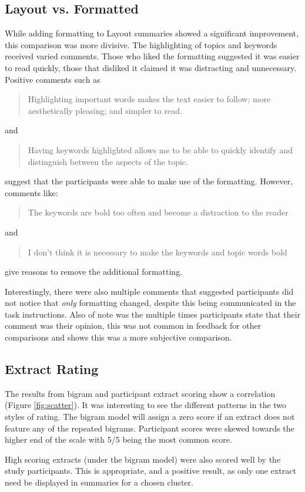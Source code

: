     \tocless\subsection{Layout vs. Formatted}
      While adding formatting to Layout summaries showed a significant improvement, this comparison was more divisive. The highlighting of topics and keywords received varied comments. Those who liked the formatting suggested it was easier to read quickly, those that disliked it claimed it was distracting and unnecessary. Positive comments such as \blockquote{Highlighting important words makes the text easier to follow; more aesthetically pleasing; and simpler to read.} and \blockquote{Having keywords highlighted allows me to be able to quickly identify and distinguish between the aspects of the topic.} suggest that the participants were able to make use of the formatting. However, comments like: \blockquote{The keywords are bold too often and become a distraction to the reader} and \blockquote{I don't think it is necessary to make the keywords and topic words bold} give reasons to remove the additional formatting.

      Interestingly, there were also multiple comments that suggested participants did not notice that \textit{only} formatting changed, despite this being communicated in the task instructions. Also of note was the multiple times participants state that their comment was their opinion, this was not common in feedback for other comparisons and shows this was a more subjective comparison.

    \tocless\subsection{Extract Rating}
      The results from bigram and participant extract scoring show a correlation (Figure \ref{fig:scatter}). It was interesting to see the different patterns in the two styles of rating. The bigram model will assign a zero score if an extract does not feature any of the repeated bigrams. Participant scores were skewed towards the higher end of the scale with 5/5 being the most common score.

      High scoring extracts (under the bigram model) were also scored well by the study participants. This is appropriate, and a positive result, as only one extract need be displayed in summaries for a chosen cluster.

